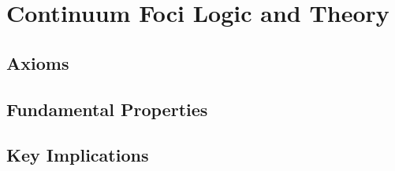 
\chapter{Continuum Foci Logic and Theory}
\label{ch:cflt}

\section{Axioms}

\section{Fundamental Properties}

\section{Key Implications}
